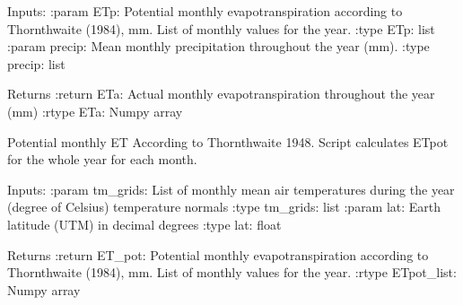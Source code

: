 \documentclass[letterpaper,10pt,english]{sphinxmanual}
\begin{document}
\begin{fulllineitems}
\begin{fulllineitems}
Inputs:
:param ETp: Potential monthly evapotranspiration according
to Thornthwaite (1984), mm. List of monthly values for the year.
:type ETp: list
:param precip: Mean monthly precipitation throughout the year (mm).
:type precip: list

Returns
:return ETa: Actual monthly evapotranspiration throughout the year (mm) 
:rtype ETa: Numpy array

\end{fulllineitems}


\begin{fulllineitems}
\label{\detokenize{libs:waterflow.WaterBalance.evapoPot}}
Potential monthly ET According to Thornthwaite 1948. Script
calculates ETpot for the whole year \sphinxhyphen{} for each month.

Inputs:
:param tm\_grids: List of monthly mean air temperatures during
the year (degree of Celsius) \sphinxhyphen{} temperature normals
:type tm\_grids: list
:param lat: Earth latitude (UTM) in decimal degrees
:type lat: float

Returns
:return ET\_pot: Potential monthly evapotranspiration according
to Thornthwaite (1984), mm. List of monthly values for the year.
:rtype ETpot\_list: Numpy array

\end{fulllineitems}



\end{fulllineitems}
\end{document}
